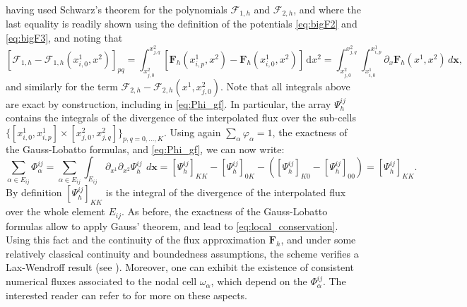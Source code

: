 \documentclass[a4paper,10pt]{article}
\begin{document}
 having used Schwarz's theorem for the polynomials  $\mathcal{F}_{1,h}$ and $\mathcal{F}_{2,h}$, and where the last  equality is readily shown using the definition of the potentials  \eqref{eq:bigF2}  and \eqref{eq:bigF3},
and noting that 
$$
[\mathcal{F}_{1,h} - \mathcal{F}_{1,h}(x^1_{i,0},x^2)]_{pq}=
 \int_{x^2_{j,0}}^{x^2_{j,q}}[  \mathbf{F}_h(x^1_{i,p},x^2) -\mathbf{F}_h(x^1_{i,0},x^2)]\,\mathrm{d}x^2 =  \int_{x^2_{j,0}}^{x^2_{j,q}}\int_{x^1_{i,0}}^{x^1_{i,p}} \partial_x \mathbf{F}_h(x^1,x^2) \,d\mathbf{x},
$$
and similarly for the   term $ \mathcal{F}_{2,h} - \mathcal{F}_{2,h}(x^1, x^2_{j,0})$. Note that all integrals above are exact by construction, including in \eqref{eq:Phi_gf}. In particular,  the array $\Psi^{ij}_h$ contains the  integrals of the   divergence of the  interpolated flux over the sub-cells 
$\{[x^1_{i,0},x^1_{i,p}] \times [ x^2_{j,0},x^2_{j,q} ]\}_{p,q=0,\dots,K}$. Using again $\sum_\alpha\varphi_\alpha=1$, the exactness of the Gauss-Lobatto formulas, and \eqref{eq:Phi_gf}, we can now write:
\begin{equation}\label{eq:proofPhi}
\sum_{\alpha\in E_{ij}} \Phi_{\alpha}^{ij}  =   \sum_{\alpha\in E_{ij}}\int_{E_{ij}}  \partial_{x^1} \partial_{x^2}\Psi^{ij}_h\ \,d\mathbf{x} = [  \Psi^{ij}_h]_{KK} -  [  \Psi^{ij}_h]_{0K} - (  [\Psi^{ij}_h]_{K0} -  [\Psi^{ij}_h]_{00}) = [  \Psi^{ij}_h]_{KK}.
\end{equation}
By definition $[  \Psi^{ij}_h]_{KK}$ is the integral of the  divergence of  the interpolated flux over the whole element  $E_{ij}$. As before, the  exactness of the Gauss-Lobatto formulas allow to apply Gauss' theorem, and lead to \eqref{eq:local_conservation}.  Using this fact and  the continuity of the flux approximation $\mathbf{F}_h$, and under some relatively classical continuity and boundedness assumptions,
the scheme  verifies  a Lax-Wendroff result  (see \cite[Section \S4.1]{amr2025}).  Moreover, one can exhibit the existence of consistent numerical fluxes  associated to the nodal cell  $\omega_\alpha$,
which depend on  the $\Phi_{\alpha}^{ij}$.
The interested reader can refer to \cite{amr2025,AR:17,abgrall2020notion,Abgrall2022,barsukow2025genuinely,GRD26} for more  on these aspects.
\end{document}
